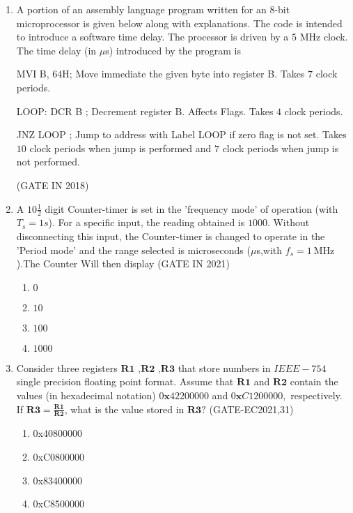 
\begin{enumerate}

\item
\label{prob:gate IN 45}
 A portion of an assembly language program written for an $8$-bit microprocessor is given below along with explanations. The code is intended to introduce a software time delay. The processor is driven by a $5$ MHz clock. The time delay (in $\mu$s) introduced by the program is \vspace{12 pt}


MVI B, $64$H; Move immediate the given byte into register B. Takes $7$ clock periods.\vspace{12 pt}


LOOP: DCR B ; Decrement register B. Affects Flags. Takes $4$ clock periods. \vspace{12 pt}


JNZ LOOP ; Jump to address with Label LOOP if zero flag is not set. Takes $10$ clock periods when jump is performed and $7$ clock periods when jump is not performed.

\hfill(GATE IN 2018)

\item A $10\frac{1}{2}$ digit Counter-timer is set in the 'frequency mode' of operation (with $T_s=1s$). For a specific input, the reading obtained is $1000$. Without disconnecting this input, the Counter-timer is changed to operate in the 'Period mode' and the range selected is microseconds ($\mu$s,with $f_s=\SI{1}{\mega\hertz}$).The Counter Will then display
\hfill(GATE IN 2021)
\begin{enumerate}
  \item $0$
  \item $10$
  \item $100$
  \item $1000$
\end{enumerate}

\item Consider three registers $\textbf{R1 ,R2 ,R3}$ that store numbers in $ IEEE-754 $ single precision floating point format. Assume that $\textbf{R1}$ and $\textbf{R2}$ contain the values (in hexadecimal notation) $0\textbf{x}42200000$ and $0\textbf{x}C1200000,$ respectively. If $ \textbf{R3}=\frac{\textbf{R1}}{\textbf{R2}} $, what is the value stored in $\textbf{R3}?$
\hfill(GATE-EC2021,31)
\begin{enumerate}
    \item 0x40800000
    \item 0xC0800000
    \item 0x83400000
    \item 0xC8500000
\end{enumerate}


\end{enumerate}
